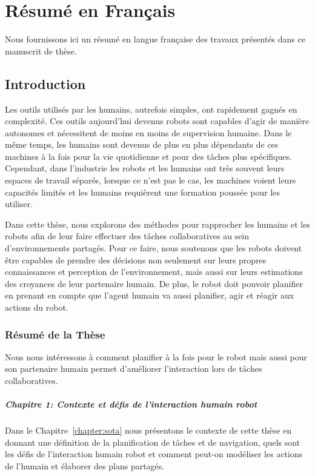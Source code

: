 \chapter{Résumé en Français}
\label{annex:frenchversion}
Nous fournissons ici un résumé en langue française des travaux présentés dans ce manuscrit de thèse.

\section{Introduction}
Les outils utilisés par les humains, autrefois simples, ont rapidement gagnés en complexité. Ces outils aujourd'hui devenus robots sont capables d'agir de manière autonomes et nécessitent de moins en moins de supervision humaine. Dans le même temps, les humains sont devenus de plus en plus dépendants de ces machines à la fois pour la vie quotidienne et pour des tâches plus spécifiques. Cependant, dans l'industrie les robots et les humains ont très souvent leurs espaces de travail séparés, lorsque ce n'est pas le cas, les machines voient leurs capacités limités et les humains requièrent une formation poussée pour les utiliser.

Dans cette thèse, nous explorons des méthodes pour rapprocher les humains et les robots afin de leur faire effectuer des tâches collaboratives au sein d’environnements partagés. Pour ce faire, nous soutenons que les robots doivent être capables de prendre des décisions non seulement sur leurs propres connaissances et perception de l’environnement, mais aussi sur leurs estimations des croyances de leur partenaire humain. De plus, le robot doit pouvoir planifier en prenant en compte que l'agent humain va aussi planifier, agir et réagir aux actions du robot.

\subsection{Résumé de la Thèse}
Nous nous intéressons à comment planifier à la fois pour le robot mais aussi pour son partenaire humain permet d'améliorer l'interaction lors de tâches collaboratives. 

\paragraph{Chapitre 1: Contexte et défis de l'interaction humain robot}
Dans le Chapitre~\ref{chapter:sota} nous présentons le contexte de cette thèse en donnant une définition de la planification de tâches et de navigation, quels sont les défis de l'interaction humain robot et comment peut-on modéliser les actions de l'humain et élaborer des plans partagés. 


